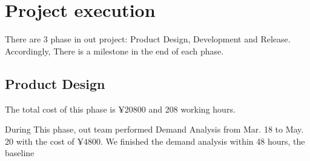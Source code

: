 \documentclass[runningheads]{llncs}
\begin{document}
\section{Project execution}
There are 3 phase in out project: Product Design, Development and Release. Accordingly, There is a milestone in the end of each phase.
\subsection{Product Design}
The total cost of this phase is ¥20800 and 208 working hours. 

During This phase, out team performed Demand Analysis from Mar. 18 to May. 20 with the cost of ¥4800.
We finished the demand analysis within 48 hours, the baseline
\end{document}
